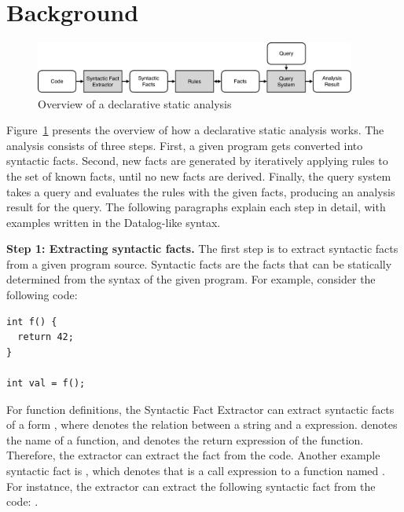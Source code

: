 \section{Background}\label{sec:background} 
\begin{figure}[t]
  \centering
  \vspace{2mm}
  \includegraphics[width=0.94\textwidth]{img/ov1.pdf}
  \caption{Overview of a declarative static analysis}
  \label{fig:ov1}
\end{figure}

Figure~\ref{fig:ov1} presents the overview of how a declarative static
analysis works.  The analysis consists of three steps.  First, a given program
gets converted into syntactic facts. 
Second, new facts are generated by iteratively applying rules to the set of
known facts, until no new facts are derived.  
Finally, the query system takes a query and evaluates the rules with the given
facts, producing an analysis result for the query. 
The following paragraphs explain each step in detail, with examples written in
the Datalog-like syntax.


\textbf{Step 1: Extracting syntactic facts.}
The first step is to extract syntactic facts from a given program source.
Syntactic facts are the facts that can be statically determined
from the syntax of the given program.
For example, consider the following code:

\begin{lstlisting}[style=mcpp]
int f() {
  return 42;
}

int val = f();
\end{lstlisting}

For function definitions, the Syntactic Fact Extractor can extract syntactic
facts of a form , where 
denotes the relation between a string and a expression.  denotes the name of a
function, and  denotes the return expression of the function.
Therefore, the extractor can extract the fact  from
the code.  
Another example syntactic fact is , which
denotes that  is a call expression to a function named
.
For instatnce, the extractor can extract the following syntactic fact from the
code: .

